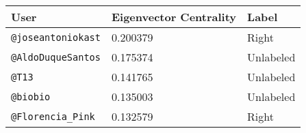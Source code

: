 \begin{tabular}{lll}
    \toprule\toprule
        User & Eigenvector Centrality & Label \\ \midrule
        \texttt{@joseantoniokast} & 0.200379 & Right \\ 
        \texttt{@AldoDuqueSantos} & 0.175374 & Unlabeled \\
        \texttt{@T13} & 0.141765 & Unlabeled \\ 
        \texttt{@biobio} & 0.135003	 & Unlabeled \\ 
        \texttt{@Florencia\_Pink} & 0.132579 & Right \\ 
       
        \bottomrule\bottomrule
    \end{tabular}